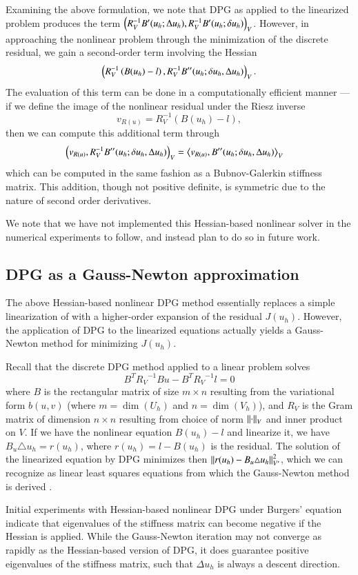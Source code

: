 Examining the above formulation, we note that DPG as applied to the linearized problem produces the term $ \LRp{R_V^{-1}B'(u_h;\Delta u_h), R_V^{-1}B'(u_h;\delta u_h)}_V$. However, in approaching the nonlinear problem through the minimization of the discrete residual, we gain a second-order term involving the Hessian
\[
\LRp{R_V^{-1}\left(B(u_h)-l\right),R_V^{-1}B''(u_h;\delta u_h,\Delta u_h)}_V.
\] 
The evaluation of this term can be done in a computationally efficient manner --- if we define the image of the nonlinear residual under the Riesz inverse
\[
v_{R(u)} = R_V^{-1}\left(B(u_h)-l\right),
\]
then we can compute this additional term through
\begin{align*}
\LRp{v_{R(u)},R_V^{-1}B''(u_h;\delta u_h,\Delta u_h)}_V &= \LRa{v_{R(u)},B''(u_h;\delta u_h,\Delta u_h)}_V
\end{align*}
which can be computed in the same fashion as a Bubnov-Galerkin stiffness matrix. This addition, though not positive definite, is symmetric due to the nature of second order derivatives. 

We note that we have not implemented this Hessian-based nonlinear solver in the numerical experiments to follow, and instead plan to do so in future work.  

\subsection{DPG as a Gauss-Newton approximation}

The above Hessian-based nonlinear DPG method essentially replaces a simple linearization of with a higher-order expansion of the residual $J(u_h)$.  However, the application of DPG to the linearized equations actually yields a Gauss-Newton method for minimizing $J(u_h)$.  

Recall that the discrete DPG method applied to a linear problem solves
\[
{B}^T{R_V}^{-1}{B}u - {B}^T{R_V}^{-1}l  = 0
\]
where ${B}$ is the rectangular matrix of size $m\times n$ resulting from the variational form $b(u,v)$ (where $m = \dim(U_h)$ and $n = \dim(V_h)$), and ${R_V}$ is the Gram matrix of dimension $n\times n$ resulting from choice of norm $\nor{\cdot}_V$ and inner product on $V$.  If we have the nonlinear equation ${B}(u_h)-{l}$ and linearize it, we have ${B}_u\triangle u_h = {r}(u_h)$, where $r(u_h) = l-B(u_h)$ is the residual.  The solution of the linearized equation by DPG minimizes then $\nor{r(u_h) - B_u\triangle u_h}_{V'}^2$, which we can recognize as linear least squares equations from which the Gauss-Newton method is derived \cite{Nocedal2006NO}.

Initial experiments with Hessian-based nonlinear DPG under Burgers' equation indicate that eigenvalues of the stiffness matrix can become negative if the Hessian is applied.  While the Gauss-Newton iteration may not converge as rapidly as the Hessian-based version of DPG, it does guarantee positive eigenvalues of the stiffness matrix, such that $\Delta u_h$ is always a descent direction.  